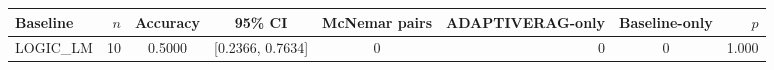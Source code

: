 \begin{tabular}{lrcccrcr}
\toprule
Baseline & $n$ & Accuracy & 95\% CI & McNemar pairs & ADAPTIVERAG-only & Baseline-only & $p$ \\
\midrule
LOGIC\_LM & 10 & 0.5000 & [0.2366, 0.7634] & 0 & 0 & 0 & 1.000 \\
\bottomrule
\end{tabular}